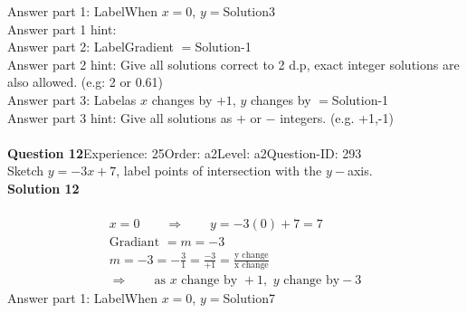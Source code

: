 \documentclass{article}
\begin{document}
Answer part 1: \hspace{10pt}Label\hspace{10pt}When $x=0$, $y=$\hspace{10pt}Solution\hspace{10pt}3\\
Answer part 1 hint: \hspace{15pt}\\
Answer part 2: \hspace{10pt}Label\hspace{10pt}Gradient $=$\hspace{10pt}Solution\hspace{10pt}-1\\
Answer part 2 hint: \hspace{15pt}Give all solutions correct to 2 d.p, exact integer solutions are also allowed. (e.g: 2 or 0.61)\\
Answer part 3: \hspace{10pt}Label\hspace{10pt}as $x$ changes by $+1$, $y$ changes by $=$\hspace{10pt}Solution\hspace{10pt}-1\\
Answer part 3 hint: \hspace{15pt}Give all solutions as $+$ or $-$ integers. (e.g. +1,-1)\\
\\[4pt]
\noindent\textbf{Question 12}\hspace{20pt}Experience: 25\hspace{20pt}Order: a2\hspace{20pt}Level: a2\hspace{20pt}Question-ID: 293\\[2pt]
Sketch $y=-3x+7$, label points of intersection with the $y-$axis.\\[4pt]
\noindent\textbf{Solution 12}\\[2pt]
\\[-35pt]\begin{align*}
&x=0\qquad\Rightarrow\qquad y=-3(0)+7=7&\\[2pt]
&\text{Gradiant}\,\,=m=-3&\\[2pt]
&m=-3=-\displaystyle\frac{3}{1}=\displaystyle\frac{-3}{+1}=\displaystyle\frac{\text{y change}}{\text{x change}}&\\[2pt]
& \Rightarrow\qquad \text{as}\,\, x \,\,\text{change by } +1,\,\, y\,\, \text{change by} -3 &
\end{align*}
Answer part 1: \hspace{10pt}Label\hspace{10pt}When $x=0$, $y=$\hspace{10pt}Solution\hspace{10pt}7\\
\end{document}
